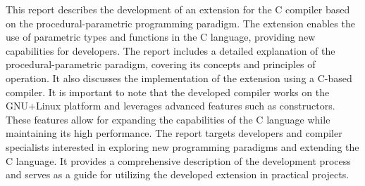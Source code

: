 
This report describes the development of an extension for the C compiler based on the procedural-parametric programming paradigm. The extension enables the use of parametric types and functions in the C language, providing new capabilities for developers.
The report includes a detailed explanation of the procedural-parametric paradigm, covering its concepts and principles of operation. It also discusses the implementation of the extension using a C-based compiler.
It is important to note that the developed compiler works on the GNU+Linux platform and leverages advanced features such as constructors. These features allow for expanding the capabilities of the C language while maintaining its high performance.
The report targets developers and compiler specialists interested in exploring new programming paradigms and extending the C language. It provides a comprehensive description of the development process and serves as a guide for utilizing the developed extension in practical projects.
